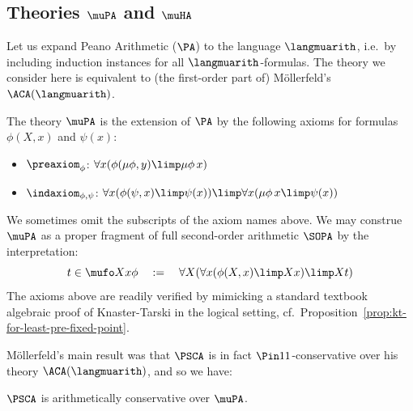 \subsection{Theories $\muPA$ and $\muHA$}
Let us expand Peano Arithmetic ($\PA$) to the language $\langmuarith$, i.e.\ by including induction instances for all $\langmuarith$-formulas.
The theory we consider here is equivalent to (the first-order part of) M\"ollerfeld's $\ACA(\langmuarith)$.

\begin{definition}
    [Theory]
    \label{def:muPA}
    The theory $\muPA$ is the extension of $\PA$ by the following axioms for formulas $\phi(X,x)$ and $\psi(x)$:
    \begin{itemize}
        \item $\preaxiom_\phi$: $\forall x (\phi(\mu \phi, y) \limp \mu \phi\,  x)$
        \item $\indaxiom_{\phi,\psi}$: $\forall x (\phi(\psi, x) \limp \psi(x)) \limp \forall x (\mu \phi\, x  \limp \psi(x))$
    \end{itemize}
\end{definition}


We sometimes omit the subscripts of the axiom names above.
We may construe $\muPA$ as a proper fragment of full second-order arithmetic $\SOPA$ by the interpretation:
\begin{equation}
    \label{eq:mufo-as-so-int-pre}
    t \in \mufo X x \phi 
    \quad := \quad
    \forall X (\forall x (\phi(X,x) \limp Xx) \limp Xt)
\end{equation}
The axioms above are readily verified by mimicking a standard textbook algebraic proof of Knaster-Tarski in the logical setting, cf.~Proposition~\ref{prop:kt-for-least-pre-fixed-point}.


M\"ollerfeld's main result was that $\PSCA$ is in fact $\Pin 1 1 $-conservative over his theory $\ACA(\langmuarith)$, and so we have:

\begin{theorem}
    \label{thm:moellerfeld-psca-cons-over-muPA}
    $\PSCA$ is arithmetically conservative over $\muPA$.
\end{theorem}





